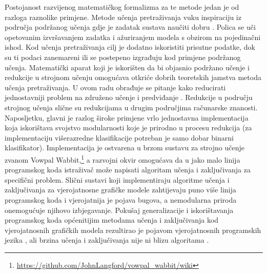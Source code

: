 Postojanost razvijenog matematičkog formalizma za te metode jedan je od razloga
raznolike primjene. Metode učenja pretraživanja vuku inspiraciju iz područja
podržanog učenja  gdje je zadatak sustava naučiti
dobru .
Polica se uči opetovanim izvršavanjem zadatka i ažuriranjem modela s obzirom na
pojedinačni ishod. Kod učenja pretraživanja cilj je dodatno iskoristiti prisutne
podatke, dok su ti podaci zanemareni ili se postepeno izgrađuju kod primjene
podržanog učenja. Matematički aparat koji je iskorišten da bi objasnio podržano
učenje i redukcije u strojnom učenju 
omogućava otkriće dobrih teoretskih jamstva metoda učenja pretraživanja. U ovom
radu obrađuje se pitanje kako reducirati jednostavniji problem na združeno
učenje i predviđanje . Redukcije u području
strojnog učenja slične su redukcijama u drugim područjima računarske znanosti.
Naposljetku, glavni je razlog široke primjene vrlo jednostavna implementacija
koja iskorištava svojstvo modularnosti koje je prirodno u procesu redukcija (za
implementaciju višerazredne klasifikacije potreban je samo dobar binarni
klasifikator). Implementacija je ostvarena u brzom sustavu za strojno učenje
zvanom Vowpal
Wabbit,\footnote{\url{https://github.com/JohnLangford/vowpal_wabbit/wiki}} a
\lts{} razvojni okvir omogućava da u jako malo linija programskog koda
istraživač može napisati algoritam učenja i zaključivanja za specifični problem.
Slični sustavi koji implementiraju algoritme učenja i zaključivanja za
vjerojatnosne grafičke modele zahtijevaju puno više linija programskog koda i
vjerojatnija je pojava bugova, a nemodularna priroda onemogućuje njihovo
izbjegavanje. Pokušaj generalizacije i iskorištavanja programskog koda
općenitijim metodama učenja i zaključivanja kod vjerojatnosnih grafičkih modela
rezultirao je pojavom vjerojatnosnih programskih jezika , ali brzina učenja i zaključivanja nije ni blizu
algoritama \lts{}.

